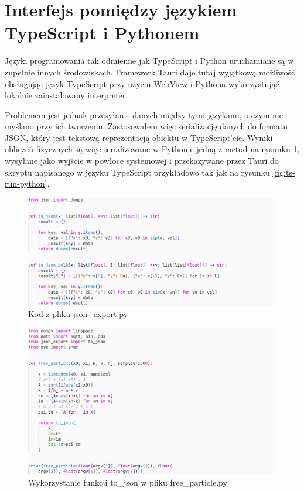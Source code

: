 \documentclass{SGGW-thesis}
\begin{document}
		
	\section{Interfejs pomiędzy językiem TypeScript i Pythonem}
		Języki programowania tak odmienne jak TypeScript i Python uruchamiane są w zupełnie innych środowiskach. Framework Tauri daje tutaj wyjątkową możliwość obsługując język TypeScript przy użyciu WebView\cite{tauri-arch} i Pythona wykorzystująć lokalnie zainstalowany interpreter\cite{tauri-shell}.
		
		Problemem jest jednak przesyłanie danych między tymi językami, o czym nie myślano przy ich tworzeniu. Zastosowałem więc serializację danych do formatu JSON, który jest tekstową reprezentacją obiektu w TypeScript'cie. Wyniki obliczeń fizycznych są więc serializowane w Pythonie jedną z metod na rysunku \ref{fig:to-json}, wysyłane jako wyjście w powłoce systemowej i przekazywane przez Tauri do skryptu napisanego w języku TypeScript przykładowo tak jak na rysunku \ref{fig:ts-run-python}.
		
	\begin{figure}[H]
	\includegraphics[width=\textwidth,height=\textheight,keepaspectratio]{to_json.png} 
	\caption{Kod z pliku json\_export.py}
	\label{fig:to-json}
	\end{figure}	
	
	\begin{figure}[H]
	\includegraphics[width=\textwidth,height=\textheight,keepaspectratio]{free_particle py.png} 
	\caption{Wykorzystanie funkcji to\_json w pliku free\_particle.py}
	\label{fig:free-particle-py}
	\end{figure}
	
\end{document}
